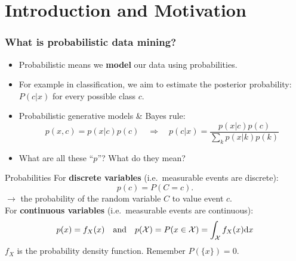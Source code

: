 \documentclass{beamer}
\begin{document}

\section{Introduction and Motivation}

\begin{frame} \frametitle{What is probabilistic data mining?}
\begin{itemize}
\item Probabilistic means we {\bf model} our data  using probabilities.
\item For example in classification, we aim to estimate the posterior probability: $P(c|x)$ for every possible class $c$.
\item Probabilistic generative models \& Bayes rule:
\[p(x,c) = p(x|c)p(c) \quad\Rightarrow\quad p(c|x) = \frac{p(x|c)p(c)}{\sum\limits_k p(x|k)p(k)} \]
\item What are all these ``$p$''? What do they mean?
\end{itemize}
\end{frame}

\begin{frame}{Probabilities}
For {\bf discrete variables} (i.e.\ measurable events are discrete):
\[ p(c) = P(C=c). \]
$\rightarrow$ the probability of the random variable $C$ to value event $c$.\vspace{7mm}\\
For {\bf continuous variables} (i.e.\ measurable events are continuous):
\[ p(x) = f_X(x) \quad \text{and} \quad p({\cal X})=P(x\in{\cal X})=\int_{\cal X}f_X(x)\textrm{d}x \]
$f_X$ is the probability density function. Remember $P(\{x\})=0$.
\end{frame}
\end{document}
